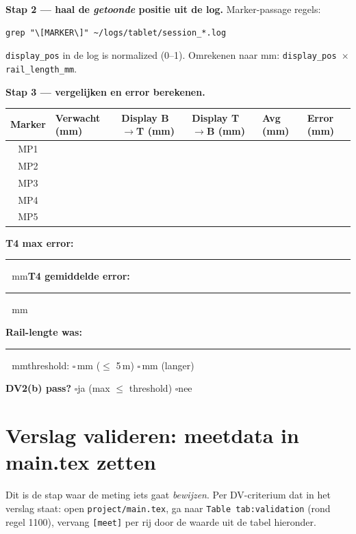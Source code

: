 \documentclass[11pt, a4paper]{article}
\newcommand{\cbox}{$\square$\;}
\newcommand{\fillshort}{\rule[-0.5ex]{2cm}{0.4pt}}
\begin{document}
\textbf{Stap 2 --- haal de \emph{getoonde} positie uit de log.}
Marker-passage regels:

\begin{lstlisting}
grep "\[MARKER\]" ~/logs/tablet/session_*.log
\end{lstlisting}

\texttt{display\_pos} in de log is normalized (0--1). Omrekenen naar
mm: \texttt{display\_pos $\times$ rail\_length\_mm}.

\textbf{Stap 3 --- vergelijken en error berekenen.}

\renewcommand{\arraystretch}{1.9}
\begin{tabular}{@{}|c|p{2.2cm}|p{2.5cm}|p{2.5cm}|p{1.8cm}|p{1.6cm}|@{}}
\hline
\textbf{Marker} & \textbf{Verwacht (mm)} & \textbf{Display B$\to$T (mm)} & \textbf{Display T$\to$B (mm)} & \textbf{Avg (mm)} & \textbf{Error (mm)} \\ \hline
MP1 & & & & & \\ \hline
MP2 & & & & & \\ \hline
MP3 & & & & & \\ \hline
MP4 & & & & & \\ \hline
MP5 & & & & & \\ \hline
\end{tabular}
\renewcommand{\arraystretch}{1.0}

\textbf{T4 max error:} \fillshort\ \,mm\hfill\textbf{T4 gemiddelde error:} \fillshort\ \,mm

\textbf{Rail-lengte was:} \fillshort\ \,mm\hfill threshold: \cbox 5\,mm ($\leq$ 5\,m) \cbox 10\,mm (langer)

\textbf{DV2(b) pass?} \cbox ja (max $\leq$ threshold)\hspace{1em} \cbox nee

\section{Verslag valideren: meetdata in main.tex zetten}

Dit is de stap waar de meting iets gaat \emph{bewijzen}. Per
DV-criterium dat in het verslag staat: open \texttt{project/main.tex},
ga naar \texttt{Table tab:validation} (rond regel 1100), vervang
\texttt{[meet]} per rij door de waarde uit de tabel hieronder.
\end{document}
